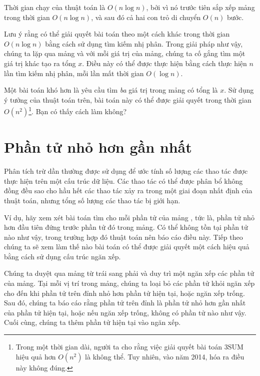 Thời gian chạy của thuật toán là
$O(n \log n)$, bởi vì nó trước tiên sắp xếp
mảng trong thời gian $O(n \log n)$,
và sau đó cả hai con trỏ di chuyển $O(n)$ bước.

Lưu ý rằng có thể giải quyết bài toán
theo một cách khác trong thời gian $O(n \log n)$ bằng cách sử dụng tìm kiếm nhị phân.
Trong giải pháp như vậy, chúng ta lặp qua mảng
và với mỗi giá trị của mảng, chúng ta cố gắng tìm một
giá trị khác tạo ra tổng $x$.
Điều này có thể được thực hiện bằng cách thực hiện $n$ lần tìm kiếm nhị phân,
mỗi lần mất thời gian $O(\log n)$.

Một bài toán khó hơn là
 yêu cầu tìm
\emph{ba} giá trị trong mảng
có tổng là $x$.
Sử dụng ý tưởng của thuật toán trên,
bài toán này có thể được giải quyết trong thời gian $O(n^2)$\footnote{Trong một thời gian dài,
người ta cho rằng việc giải quyết
bài toán 3SUM hiệu quả hơn $O(n^2)$
là không thể.
Tuy nhiên, vào năm 2014, hóa ra \cite{gro14}
điều này không đúng.}.
Bạn có thấy cách làm không?

\section{Phần tử nhỏ hơn gần nhất}


Phân tích trừ dần thường được sử dụng để
ước tính số lượng các thao tác
được thực hiện trên một cấu trúc dữ liệu.
Các thao tác có thể được phân bổ không đồng đều sao cho
hầu hết các thao tác xảy ra trong một
giai đoạn nhất định của thuật toán, nhưng tổng
số lượng các thao tác bị giới hạn.

Ví dụ, hãy xem xét bài toán
tìm cho mỗi phần tử của mảng
, tức là,
phần tử nhỏ hơn đầu tiên đứng trước phần tử đó
trong mảng.
Có thể không tồn tại phần tử nào như vậy,
trong trường hợp đó thuật toán nên báo cáo điều này.
Tiếp theo chúng ta sẽ xem làm thế nào bài toán có thể được
giải quyết một cách hiệu quả bằng cách sử dụng cấu trúc ngăn xếp.

Chúng ta duyệt qua mảng từ trái sang phải
và duy trì một ngăn xếp các phần tử của mảng.
Tại mỗi vị trí trong mảng, chúng ta loại bỏ các phần tử khỏi ngăn xếp
cho đến khi phần tử trên đỉnh nhỏ hơn
phần tử hiện tại, hoặc ngăn xếp trống.
Sau đó, chúng ta báo cáo rằng phần tử trên đỉnh là
phần tử nhỏ hơn gần nhất của phần tử hiện tại,
hoặc nếu ngăn xếp trống, không có phần tử nào như vậy.
Cuối cùng, chúng ta thêm phần tử hiện tại vào ngăn xếp.


